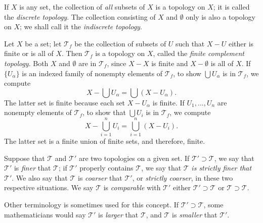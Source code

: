 \begin{example}
  If $X$ is any set, the collection of \emph{all} subsets of $X$
  is a topology on $X$; it is called the \emph{discrete
    topology}. The collection consisting of $X$ and $\emptyset$
  only is also a topology on $X$; we shall call it the
  \emph{indiscrete topology}.
\end{example}
\begin{example}
  Let $X$ be a set; let $\mathcal{T}_f$ be the collection of
  subsets of $U$ such that $X-U$ either is finite or is all of
  $X$. Then $\mathcal{T}_f$ is a topology on $X$, called the
  \emph{finite complement topology}. Both $X$ and $\emptyset$ are
  in $\mathcal{T}_f$, since $X-X$ is finite and $X-\emptyset$ is
  all of $X$. If $\{U_\alpha\}$ is an indexed family of nonempty
  elements of $\mathcal{T}_f$, to show $\bigcup U_\alpha$ is in
  $\mathcal{T}_f$, we compute
  \[X-\bigcup U_\alpha=\bigcup \left(X-U_\alpha\right).\]
  The latter set is finite because each set $X-U_\alpha$ is
  finite. If $U_1,...,U_n$ are nonempty elements of
  $\mathcal{T}_f$, to show that $\bigcup U_i$ is in
  $\mathcal{T}_f$, we compute
  \[X-\bigcup_{i=1}^nU_i=\bigcup_{i=1}^n\left(X-U_i\right).\]
  The latter set is a finite union of finite sets, and therefore,
  finite.
\end{example}
\begin{definition}
  Suppose that $\mathcal{T}$ and $\mathcal{T}'$ are two
  topologies on a given set. If $\mathcal{T}'\supset\mathcal{T}$,
  we say that $\mathcal{T}'$ is \emph{finer} that $\mathcal{T}$;
  if $\mathcal{T}'$ properly contains $\mathcal{T}$, we say that
  $\mathcal{T}$ \emph{is strictly finer that} $\mathcal{T}'$. We
  also say that $\mathcal{T}$ is \emph{coarser} that
  $\mathcal{T}'$, or \emph{strictly coarser}, in these two
  respective situations. We say $\mathcal{T}$ is
  \emph{comparable} with $\mathcal{T}'$ either
  $\mathcal{T}'\supset\mathcal{T}$ or
  $\mathcal{T}\supset\mathcal{T}$.
\end{definition}
\begin{remarks}
  Other terminology is sometimes used for this concept. If
  $\mathcal{T}'\supset\mathcal{T}$, some mathematicians would say
  $\mathcal{T}'$ is \emph{larger} that $\mathcal{T}$, and
  $\mathcal{T}$ is \emph{smaller} that $\mathcal{T}'$.
\end{remarks}
